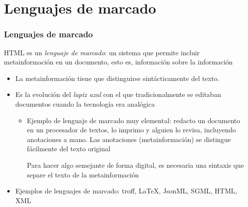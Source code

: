 \documentclass[ucs]{beamer}
\begin{document}
\section{Lenguajes de marcado}
\begin{frame}[fragile]
\frametitle{Lenguajes de marcado}
HTML es un \emph{lenguaje de marcado}: un sistema que permite incluir metainformación en un documento, esto
es, información sobre la información

\begin{itemize}
\item
La metainformación tiene que
distinguirse sintácticamente del texto.


\item
Es la evolución del \emph{lapiz azul} con el que tradicionalmente se editaban
documentos cuando la tecnología era analógica
\begin{itemize}
\item
Ejemplo de lenguaje de marcado muy elemental: redacto un documento en un procesador de textos, 
lo imprimo y alguien lo revisa, incluyendo anotaciones a mano.
Las anotaciones (metainformación) se distingue fácilmente del texto original

Para hacer algo semejante de forma digital, es necesaria una sintaxis que separe el texto
de la metainformación
\end{itemize}


\item
Ejemplos de lenguajes de marcado: troff, LaTeX, JsonML, SGML, HTML, XML


\end{itemize}

\end{frame}
\end{document}
